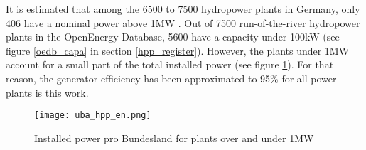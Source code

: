 It is estimated that among the 6500 to 7500 hydropower plants in Germany, only 406 have a nominal power above 1MW \cite{uba_wasserkraft}. Out of 7500 run-of-the-river hydropower plants in the OpenEnergy Database, 5600 have a capacity under 100kW (see figure \ref{oedb_capa} in section \ref{hpp_register}).  However, the plants under 1MW account for a small part of the total installed power (see figure \ref{uba_hpp}). For that reason, the generator efficiency has been approximated to 95\% for all power plants is this work.

\begin{figure}[H]
\texttt{[image: uba\_hpp\_en.png]}
\caption[Installed power pro Bundesland for plants over and under 1MW]{Installed power pro Bundesland for plants over and under 1MW \cite{uba_wasserkraft}}
\centering
\label{uba_hpp}
\end{figure}
